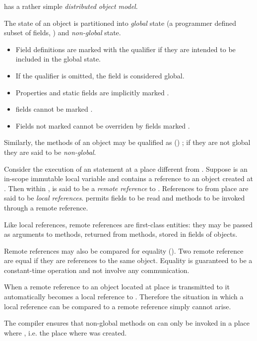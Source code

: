 \Xten{} has a rather simple \emph{distributed object model}. 

The state of an object is partitioned into \emph{global} state (a
programmer defined subset of  fields, ) and \emph{non-global} state.

 \begin{itemize}
\item  Field definitions are marked with the qualifier  if they are intended to be included in the global state. 
\item  If the  qualifier is omitted, the field is considered global. 
\item  Properties and static fields are implicitly marked . 
\item {} fields cannot be marked . 
\item  Fields not marked  cannot be overriden by fields marked .
\end{itemize}
 
Similarly, the methods of an object may be qualified as () ; if
they are not global they are said to be \emph{non-global}.


Consider the execution of an  statement at a place  different
from . Suppose  is an in-scope immutable local variable and contains a
reference to an object  created at . Then within ,  is said to be
a \emph{remote reference} to . References to  from place  are said
to be \emph{local references}. \Xten{} permits  fields to be read
and  methods to be invoked through a remote reference.


Like local references, remote references are first-class entities:
they may be passed as arguments to methods, returned from methods,
stored in fields of objects.

Remote references may also be compared for equality (\Xcd{==}). Two
remote reference are equal if they are references to the same
object. Equality is guaranteed to be a constant-time operation and not
involve any communication.

When a remote reference to an object  located at place  is
transmitted to  it automatically becomes a local reference to
. Therefore the situation in which a local reference can be compared
to a remote reference simply cannot arise.

The \Xten{} compiler ensures that non-global methods on  can only be invoked in a place where , i.e. the place where  was created.

